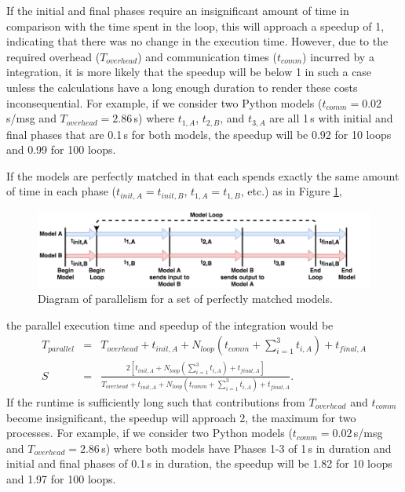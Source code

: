 \documentclass[journal]{IEEEtran}
\newcommand{\todo}[1]{{\color{red}{#1}}}
\newcommand{\pkg}{{\tt \todo{cis\_interface}}{}}
\begin{document}
%
If the initial and final phases require an insignificant amount of time in comparison with the time spent in the loop, this will approach a speedup of 1, indicating that there was no change in the execution time. However, due to the required overhead ($T_{overhead}$) and communication times ($t_{comm}$) incurred by a {\pkg} integration, it is more likely that the speedup will be below 1 in such a case unless the calculations have a long enough duration to render these costs inconsequential. For example, if we consider two Python models ($t_{comm} = 0.02$\,s/msg and $T_{overhead} = 2.86$\,s) where $t_{1,A}$, $t_{2,B}$, and $t_{3,A}$ are all 1\,s with initial and final phases that are 0.1\,s for both models, the speedup will be 0.92 for 10 loops and 0.99 for 100 loops.

If the models are perfectly matched in that each spends exactly the same amount of time in each phase ($t_{init,A}=t_{init,B}$, $t_{1,A}=t_{1,B}$, etc.) as in Figure \ref{fig:parallel},
%
\ifinclfig
 	\begin{figure}[htbp]
	\begin{center}
	\includegraphics[width=\columnwidth,keepaspectratio]{./images/Parallelism-FullyParallel.png}
	\caption{Diagram of parallelism for a set of perfectly matched models.}
	\label{fig:parallel}
	\end{center}
	\end{figure}
\fi
%
the parallel execution time and speedup of the integration would be
%
\begin{eqnarray}
T_{parallel} & = & T_{overhead} + t_{init,A} + N_{loop}\left(t_{comm} + \sum_{i=1}^{3}t_{i,A}\right) + t_{final, A} \\
S & = & \frac{2\left[t_{init,A} + N_{loop}\left(\sum_{i=1}^{3}t_{i,A}\right) + t_{final, A}\right]}{T_{overhead} + t_{init,A} + N_{loop}\left(t_{comm} + \sum_{i=1}^{3}t_{i,A}\right) + t_{final, A}}.
\end{eqnarray} 
%
If the runtime is sufficiently long such that contributions from $T_{overhead}$ and $t_{comm}$ become insignificant, the speedup will approach 2, the maximum for two processes. For example, if we consider two Python models ($t_{comm} = 0.02$\,s/msg and $T_{overhead} = 2.86$\,s) where both models have Phases 1-3 of 1\,s in duration and initial and final phases of 0.1\,s in duration, the speedup will be 1.82 for 10 loops and 1.97 for 100 loops.
\end{document}
